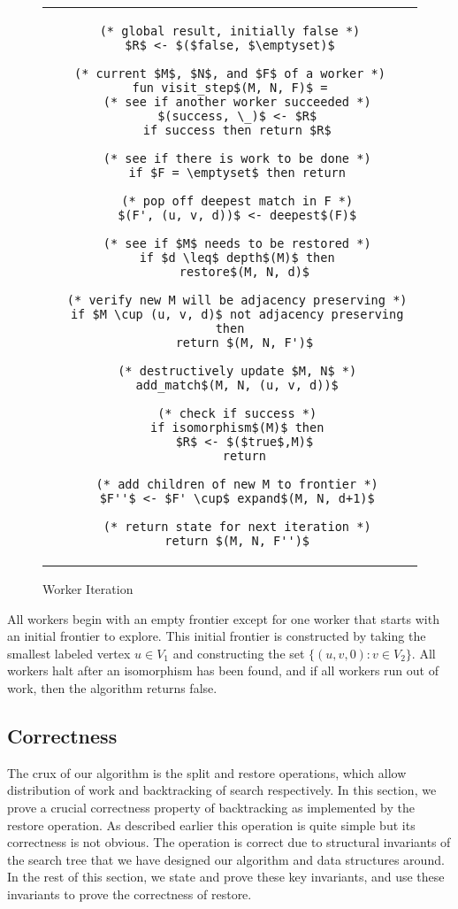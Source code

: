 %
\begin{figure}
  \centering
  \begin{tabular}{c}
\begin{lstlisting}
(* global result, initially false *)
$R$ <- $($false, $\emptyset)$

(* current $M$, $N$, and $F$ of a worker *)
fun visit_step$(M, N, F)$ =
  (* see if another worker succeeded *)
  $(success, \_)$ <- $R$
  if success then return $R$

  (* see if there is work to be done *)
  if $F = \emptyset$ then return

  (* pop off deepest match in F *)
  $(F', (u, v, d))$ <- deepest$(F)$

  (* see if $M$ needs to be restored *)
  if $d \leq$ depth$(M)$ then
    restore$(M, N, d)$

  (* verify new M will be adjacency preserving *)
  if $M \cup (u, v, d)$ not adjacency preserving then
    return $(M, N, F')$

  (* destructively update $M, N$ *)
  add_match$(M, N, (u, v, d))$

  (* check if success *)
  if isomorphism$(M)$ then
    $R$ <- $($true$,M)$
    return

  (* add children of new M to frontier *)
  $F''$ <- $F' \cup$ expand$(M, N, d+1)$

  (* return state for next iteration *)
  return $(M, N, F'')$
\end{lstlisting}
\end{tabular}
\caption{Worker Iteration}
\label{worker-par-alg}
\end{figure}


All workers begin with an empty frontier
except for one worker that starts with an initial
frontier to explore.
%
This initial frontier is constructed by taking
the smallest labeled vertex $u \in V_1$ and
constructing the set $\{(u, v, 0) : v \in V_2\}$.
%
All workers halt after an isomorphism has been
found, and if all workers run out of work, then the
algorithm returns false.
%

\subsection{Correctness}

The crux of our algorithm is the split and restore operations, which
allow distribution of work and backtracking of search respectively.
%
In this section, we prove a crucial correctness property of
backtracking as implemented by the restore operation.
%
As described earlier this operation is quite simple but its
correctness is not obvious.
%
The operation is correct due to structural invariants of the search
tree that we have designed our algorithm and data structures around.
%
In the rest of this section, we state and prove these key invariants,
and use these invariants to prove the correctness of restore.


